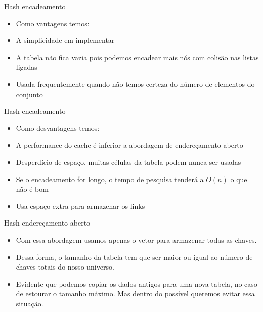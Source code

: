 \begin{frame}
	\begin{block}{Hash encadeamento}
		\begin{itemize}
			\item Como vantagens temos:
			
			\item A simplicidade em implementar	
			
			\item A tabela não fica vazia pois podemos encadear mais nós com colisão nas listas ligadas	
			
			\item Usada frequentemente quando não temos certeza do número de elementos do conjunto
		\end{itemize}
	\end{block}
\end{frame}



\begin{frame}
	\begin{block}{Hash encadeamento}
		\begin{itemize}
			\item Como desvantagens temos:
			
			\item A performance do cache é inferior a abordagem de endereçamento aberto
				
			\item Desperdício de espaço, muitas células da tabela podem nunca ser usadas
				
			\item Se o encadeamento for longo, o tempo de  pesquisa tenderá a $O(n)$ o que não é bom
		
			\item Usa espaço extra para armazenar os links
		\end{itemize}
	\end{block}
\end{frame}


\begin{frame}
	\begin{block}{Hash endereçamento aberto}
		\begin{itemize}
			\item Com essa abordagem usamos apenas o vetor para armazenar todas as chaves. 

			\item Dessa forma, o tamanho da tabela tem que ser maior ou igual ao número de chaves totais do nosso universo. 
			
			\item Evidente que podemos copiar os dados antigos para uma nova tabela, no caso de estourar o tamanho máximo. Mas dentro do possível queremos evitar essa situação.
		\end{itemize}
	\end{block}
\end{frame}

